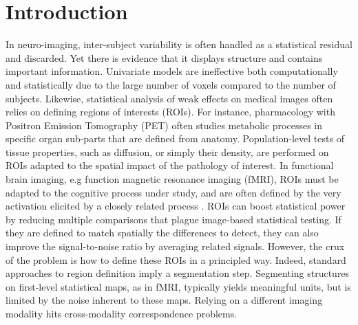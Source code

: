 
\section{Introduction} %
\label{sec:intro}
In neuro-imaging, inter-subject variability is often handled as a statistical residual and discarded. Yet there is evidence that it displays structure and contains important information. Univariate models are ineffective both computationally and statistically due to the large number of voxels compared to the number of subjects. Likewise,
statistical analysis of weak effects on medical images often relies on
defining regions of interests (ROIs). For instance, pharmacology
with Positron Emission Tomography (PET) often studies metabolic
processes in specific organ sub-parts that are defined from anatomy.
Population-level tests of tissue properties, such as diffusion, or
simply their density, are performed on ROIs adapted to the spatial
impact of the pathology of interest. In functional brain imaging,
e.g function magnetic resonance imaging (fMRI), ROIs must be
adapted to the cognitive process under study, and are often defined by
the very activation elicited by a closely related process  \cite{saxe2006}.
ROIs can boost statistical power by reducing multiple comparisons that
plague image-based statistical testing. If they are defined to match
spatially the differences to detect, they can also improve
the signal-to-noise ratio by averaging related signals. 
%
However, the crux of
the problem is how to define these ROIs in a principled way. 
%
Indeed, standard approaches to region definition imply a
segmentation step. 
Segmenting structures on first-level statistical maps, as in fMRI,
typically yields meaningful units, but is limited by the noise
inherent to these maps.
Relying on a different imaging modality
hits cross-modality correspondence problems.

